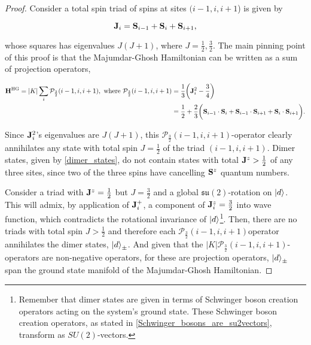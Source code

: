 \documentclass{homework}
\begin{document}
\begin{proof}

Consider a total spin triad of spins at sites $(i-1, i, i+1$) is given by 

\begin{equation}
    {\bf J}_i = {\bf S}_{i-1} + {\bf S}_i + {\bf S}_{i+1},
\end{equation}

whose squares has eigenvalues $J(J+1)$, where $J = \frac{1}{2}, \frac{3}{2}$. The main pinning point of this proof is that the Majumdar-Ghosh Hamiltonian can be written as a sum of projection operators,

\begin{equation}\begin{split}
    {\bf H}^{\textnormal{HG}} = |K| \sum_{i} \mathcal{P}_{\frac{3}{2}}(i-1,i,i+1), \textnormal{ where } 
        \mathcal{P}_{\frac{3}{2}}(i-1,i,i+1) &= \frac{1}{3} \bigg({\bf J}_i^2 - \frac{3}{4}\bigg) \\
        &= \frac{1}{2} + \frac{2}{3} \bigg({\bf S}_{i-1} \cdot {\bf S}_i + {\bf S}_{i - 1} \cdot {\bf S}_{i+1} + {\bf S}_{i} \cdot {\bf S}_{i+1} \bigg). 
    \end{split}
\end{equation}

Since ${\bf J}_i^2$'s eigenvalues are $J(J+1)$, this $\mathcal{P}_{\frac{3}{2}}(i-1,i,i+1)$-operator clearly annihilates any state with total spin $J = \frac{1}{2}$ of the triad $(i-1, i, i+1)$. Dimer states, given by \cref{dimer_states}, do not contain states with total ${\bf J}^z > \frac{1}{2}$ of any three sites, since two of the three spins have cancelling ${{\bf S}}^z$ quantum numbers.

Consider a triad with ${\bf J}^z = \frac{1}{2}$ but $J = \frac{3}{2}$ and a global $\mathfrak{s}\mathfrak{u}(2)$-rotation on $\ket{d}$. This will admix, by application of ${\bf J}_i^+$, a component of ${\bf J}_i^z = \frac{3}{2}$ into wave function, which contradicts the rotational invariance of $\ket{d}$\footnote{Remember that dimer states are given in terms of Schwinger boson creation operators acting on the system's ground state. These Schwinger boson creation operators, as stated in \cref{Schwinger_bosons_are_su2vectors}, transform as $SU(2)$-vectors. }. Then, there are no triads with total spin $J > \frac{1}{2}$ and therefore each $\mathcal{P}_{\frac{3}{2}}(i-1,i,i+1)$operator annihilates the dimer states, $\ket{d}_{\pm}$. And given that the $|K|\mathcal{P}_{\frac{3}{2}}(i-1,i,i+1)$-operators are non-negative operators, for these are projection operators, $\ket{d}_{\pm}$ span the ground state manifold of the Majumdar-Ghosh Hamiltonian.

\end{proof}
\end{document}
